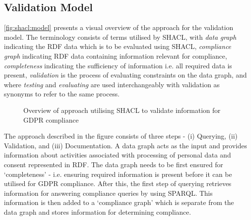 \subsection{Validation Model}\label{sec:testing:shacl:approach}
\autoref{fig:shacl:model} presents a visual overview of the approach for the validation model.
The terminology consists of terms utilised by SHACL, with \textit{data graph} indicating the RDF data which is to be evaluated using SHACL, \textit{compliance graph} indicating RDF data containing information relevant for compliance, \textit{completeness} indicating the sufficiency of information i.e. all required data is present, \textit{validation} is the process of evaluating constraints on the data graph, and where \textit{testing} and \textit{evaluating} are used interchangeably with validation as synonyms to refer to the same process.
\begin{figure}[htbp]
    \centering
    \caption{Overview of approach utilising SHACL to validate information for GDPR compliance}
    \label{fig:shacl:model}
\end{figure}

The approach described in the figure consists of three steps - (i) Querying, (ii) Validation, and (iii) Documentation. A data graph acts as the input and provides information about activities associated with processing of personal data and consent represented in RDF. The data graph needs to be first ensured for `completeness' - i.e. ensuring required information is present before it can be utilised for GDPR compliance.
After this, the first step of querying retrieves information for answering compliance queries by using SPARQL. This information is then added to a `compliance graph' which is separate from the data graph and stores information for determining compliance.

